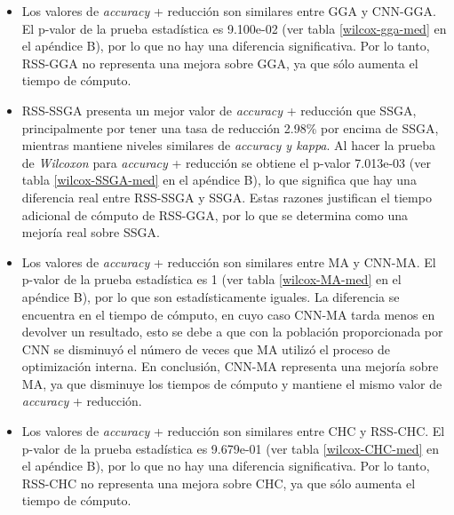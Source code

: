 \begin{itemize}
 
\item  Los valores de \emph{accuracy} + reducción son similares entre GGA y CNN-GGA. El p-valor de la prueba estadística es 9.100e-02 (ver tabla \ref{wilcox-gga-med} en el apéndice B), por lo que no hay una diferencia significativa. Por lo tanto, RSS-GGA no representa una mejora sobre GGA, ya que sólo aumenta el tiempo de cómputo.

\item RSS-SSGA presenta un mejor valor de \emph{accuracy} + reducción que SSGA, principalmente por tener una tasa de reducción 2.98\% por encima de SSGA, mientras mantiene niveles similares de \emph{accuracy y kappa}. Al hacer la prueba de \emph{Wilcoxon} para \emph{accuracy} + reducción se obtiene el p-valor 7.013e-03 (ver tabla \ref{wilcox-SSGA-med} en el apéndice B), lo que significa que hay una diferencia real entre RSS-SSGA y SSGA. Estas razones justifican el tiempo adicional de cómputo de RSS-GGA, por lo que se determina como una mejoría real sobre SSGA.

\item Los valores de \emph{accuracy} + reducción son similares entre MA y CNN-MA. El p-valor de la prueba estadística es 1 (ver tabla \ref{wilcox-MA-med} en el apéndice B), por lo que son estadísticamente iguales. La diferencia se encuentra en el tiempo de cómputo, en cuyo caso CNN-MA tarda menos en devolver un resultado, esto se debe a que con la población proporcionada por CNN se disminuyó el número de veces que MA utilizó el proceso de optimización interna. En conclusión, CNN-MA representa una mejoría sobre MA, ya que disminuye los tiempos de cómputo y mantiene el mismo valor de \emph{accuracy} + reducción.

\item  Los valores de \emph{accuracy} + reducción son similares entre CHC y RSS-CHC. El p-valor de la prueba estadística es 9.679e-01 (ver tabla \ref{wilcox-CHC-med} en el apéndice B), por lo que no hay una diferencia significativa. Por lo tanto, RSS-CHC no representa una mejora sobre CHC, ya que sólo aumenta el tiempo de cómputo.

\end{itemize}

